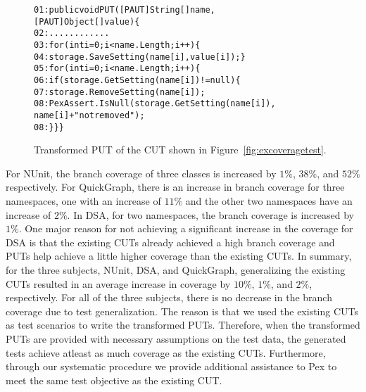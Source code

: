 \begin{figure}[t]
\begin{CodeOut}
\begin{alltt}
01: public void PUT([PAUT]String[] name, 
\hspace*{1.7in}[PAUT]Object[] value) \{
02: \hspace*{0.07in}............
03: \hspace*{0.07in}for (int i = 0; i < name.Length; i++) \{
04: \hspace*{0.22in}storage.SaveSetting(name[i], value[i]); \}
05: \hspace*{0.07in}for (int i = 0; i < name.Length; i++) \{
06: \hspace*{0.17in}if (storage.GetSetting(name[i]) != null) \{
07: \hspace*{0.3in}storage.RemoveSetting(name[i]);
08: \hspace*{0.3in}PexAssert.IsNull(storage.GetSetting(name[i]), 
\hspace*{1.5in}name[i] + " not removed"); 
08: \hspace*{0.1in}\}\}\}
\end{alltt}
\end{CodeOut} \vspace*{-4ex}
\caption{Transformed PUT of the CUT shown in Figure~\ref{fig:excoveragetest}.} \vspace*{-3ex}
\label{fig:excoveragePUT}%
\end{figure}

For NUnit, the branch coverage of three classes is increased by $1\%$, $38\%$, and $52\%$ respectively. For QuickGraph, there is an increase in branch coverage for three namespaces, one with an increase of $11\%$ and the other two namespaces have an increase of $2\%$. In DSA, for two namespaces, the branch coverage is increased  by $1\%$. One major reason for not achieving a significant increase in the coverage for DSA is that the existing CUTs already achieved a high branch coverage and PUTs help achieve a little higher coverage than the existing CUTs. In summary, for the three subjects, NUnit, DSA, and QuickGraph, generalizing the existing CUTs resulted in an average increase in coverage by $10\%$, $1\%$, and $2\%$, respectively. For all of the three subjects, there is no decrease in the branch coverage due to test generalization. The reason is that we used the existing CUTs as test scenarios to write the transformed PUTs. Therefore, when the transformed PUTs are provided with necessary assumptions on the test data, the generated tests achieve atleast as much coverage as the existing CUTs. Furthermore, through our systematic procedure we provide additional assistance to Pex to meet the same test objective as the existing CUT.


